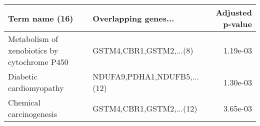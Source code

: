 \begin{tabular}{llr}
\toprule
                              Term name (16) &        Overlapping genes... &  Adjusted p-value \\
\midrule
Metabolism of xenobiotics by cytochrome P450 &     GSTM4,CBR1,GSTM2,...(8) &          1.19e-03 \\
                     Diabetic cardiomyopathy & NDUFA9,PDHA1,NDUFB5,...(12) &          1.30e-03 \\
                     Chemical carcinogenesis &    GSTM4,CBR1,GSTM2,...(12) &          3.65e-03 \\
\bottomrule
\end{tabular}
